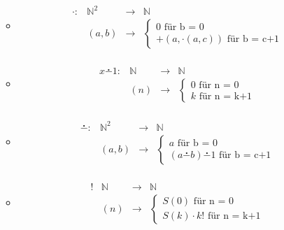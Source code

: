 \documentclass{scrartcl}
\newcommand{\dotminus}[0]{\overset{\centerdot}{-}}
\begin{document}
\begin{itemize}
\begin{itemize}
\begin{align*}
\begin{array}{cccc}
        \end{array}
        \end{align*}
        \item \begin{align*}
        \begin{array}{cccc}
           \cdot:  & \mathbb{N}^{2} &\to& \mathbb{N}  \\
             & (a,b) &\to& 
             \begin{cases}
             0 \text{ für b = 0}\\
             +(a, \cdot(a,c)) \text{ für b = c+1}
             \end{cases}
        \end{array}
        \end{align*}
        \item \begin{align*}
        \begin{array}{cccc}
           x \dotminus 1:  & \mathbb{N} &\to& \mathbb{N}  \\
             & (n) &\to& 
             \begin{cases}
             0 \text{ für n = 0}\\
             k \text{ für n = k+1}
             \end{cases}
        \end{array}
        \end{align*}
        \item \begin{align*}
        \begin{array}{cccc}
           \dotminus:  & \mathbb{N}^{2} &\to& \mathbb{N}  \\
             & (a,b) &\to& 
             \begin{cases}
             a \text{ für b = 0}\\
             (a \dotminus b) \dotminus 1 \text{ für b = c+1}
             \end{cases}
        \end{array}
        \end{align*}
        \item \begin{align*}
        \begin{array}{cccc}
           !& \mathbb{N} &\to& \mathbb{N}  \\
             & (n) &\to& 
             \begin{cases}
             S(0) \text{ für n = 0}\\
             S(k) \cdot k! \text{ für n = k+1}

\end{cases}
\end{array}
\end{align*}
\end{itemize}
\end{itemize}
\end{document}
